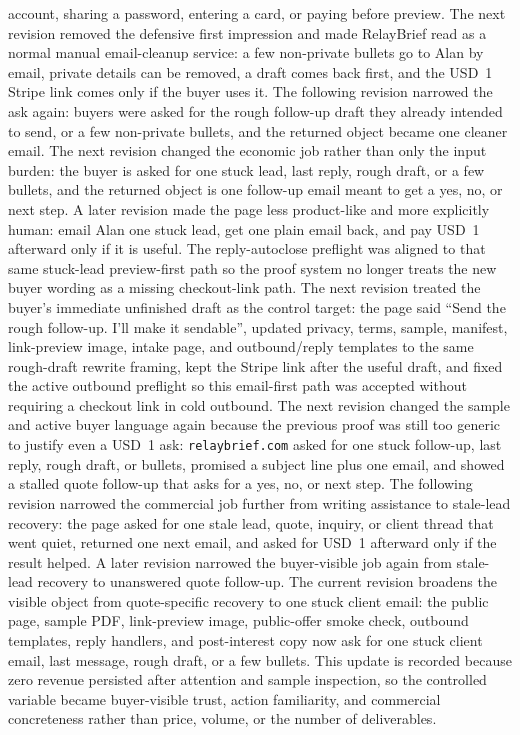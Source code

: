 \documentclass[12pt,letterpaper]{article}
\begin{document}
account, sharing a password, entering a card, or paying before preview. The next revision removed the defensive first impression and made RelayBrief read as a normal manual email-cleanup service: a few non-private bullets go to Alan by email, private details can be removed, a draft comes back first, and the USD~1 Stripe link comes only if the buyer uses it. The following revision narrowed the ask again: buyers were asked for the rough follow-up draft they already intended to send, or a few non-private bullets, and the returned object became one cleaner email. The next revision changed the economic job rather than only the input burden: the buyer is asked for one stuck lead, last reply, rough draft, or a few bullets, and the returned object is one follow-up email meant to get a yes, no, or next step. A later revision made the page less product-like and more explicitly human: email Alan one stuck lead, get one plain email back, and pay USD~1 afterward only if it is useful. The reply-autoclose preflight was aligned to that same stuck-lead preview-first path so the proof system no longer treats the new buyer wording as a missing checkout-link path. The next revision treated the buyer's immediate unfinished draft as the control target: the page said \enquote{Send the rough follow-up. I'll make it sendable}, updated privacy, terms, sample, manifest, link-preview image, intake page, and outbound/reply templates to the same rough-draft rewrite framing, kept the Stripe link after the useful draft, and fixed the active outbound preflight so this email-first path was accepted without requiring a checkout link in cold outbound. The next revision changed the sample and active buyer language again because the previous proof was still too generic to justify even a USD~1 ask: \texttt{relaybrief.com} asked for one stuck follow-up, last reply, rough draft, or bullets, promised a subject line plus one email, and showed a stalled quote follow-up that asks for a yes, no, or next step. The following revision narrowed the commercial job further from writing assistance to stale-lead recovery: the page asked for one stale lead, quote, inquiry, or client thread that went quiet, returned one next email, and asked for USD~1 afterward only if the result helped. A later revision narrowed the buyer-visible job again from stale-lead recovery to unanswered quote follow-up. The current revision broadens the visible object from quote-specific recovery to one stuck client email: the public page, sample PDF, link-preview image, public-offer smoke check, outbound templates, reply handlers, and post-interest copy now ask for one stuck client email, last message, rough draft, or a few bullets. This update is recorded because zero revenue persisted after attention and sample inspection, so the controlled variable became buyer-visible trust, action familiarity, and commercial concreteness rather than price, volume, or the number of deliverables.
\end{document}
